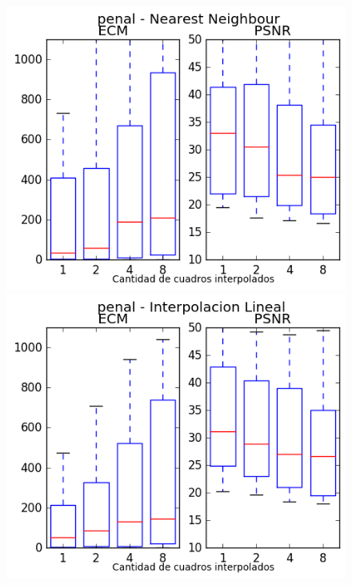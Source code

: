 \begin{figure}[H]
\centering
\begin{minipage}{0.35\textwidth}
    \includegraphics[width=1\textwidth]{imgs/resultados_error/penal_0.png}
\end{minipage}%
\begin{minipage}{0.35\textwidth}   
    \includegraphics[width=1\textwidth]{imgs/resultados_error/penal_1.png} 
\end{minipage}
\end{figure}
